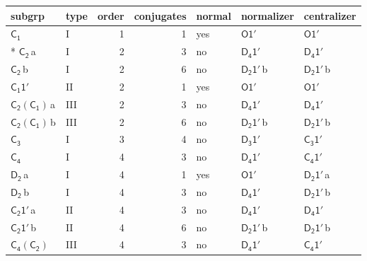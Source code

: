 \documentclass[10pt,a4paper]{article}
\numberwithin{equation}{section}
\newcommand{\grp}[1]{\mathsf{#1}}
\newcommand{\clsletter}[1]{\,{\scriptsize\color{black!55}#1}}
\begin{document}
{\small\begin{longtable}{@{}llrrlll@{}}\toprule
subgrp & type & order & conjugates & normal & normalizer & centralizer\\\midrule\endhead
\bottomrule\endfoot\endlastfoot
\href{../../../rotation/data/pdf/C1.pdf}{$\grp{C_{1}}$} & I & 1 & 1 & yes & \href{O-1p.pdf}{$\grp{O1'}$} & \href{O-1p.pdf}{$\grp{O1'}$}\\*
\href{../../../rotation/data/pdf/C2.pdf}{$\grp{C_{2}}$}\clsletter{a} & I & 2 & 3 & no & \href{D4-1p.pdf}{$\grp{D_{4}1'}$} & \href{D4-1p.pdf}{$\grp{D_{4}1'}$}\\
\href{../../../rotation/data/pdf/C2.pdf}{$\grp{C_{2}}$}\clsletter{b} & I & 2 & 6 & no & \href{D2-1p.pdf}{$\grp{D_{2}1'}$}\clsletter{b} & \href{D2-1p.pdf}{$\grp{D_{2}1'}$}\clsletter{b}\\
\href{C1-1p.pdf}{$\grp{C_{1}1'}$} & II & 2 & 1 & yes & \href{O-1p.pdf}{$\grp{O1'}$} & \href{O-1p.pdf}{$\grp{O1'}$}\\
\href{C2-C1.pdf}{$\grp{C_{2}}(\grp{C_{1}})$}\clsletter{a} & III & 2 & 3 & no & \href{D4-1p.pdf}{$\grp{D_{4}1'}$} & \href{D4-1p.pdf}{$\grp{D_{4}1'}$}\\
\href{C2-C1.pdf}{$\grp{C_{2}}(\grp{C_{1}})$}\clsletter{b} & III & 2 & 6 & no & \href{D2-1p.pdf}{$\grp{D_{2}1'}$}\clsletter{b} & \href{D2-1p.pdf}{$\grp{D_{2}1'}$}\clsletter{b}\\
\href{../../../rotation/data/pdf/C3.pdf}{$\grp{C_{3}}$} & I & 3 & 4 & no & \href{D3-1p.pdf}{$\grp{D_{3}1'}$} & \href{C3-1p.pdf}{$\grp{C_{3}1'}$}\\
\href{../../../rotation/data/pdf/C4.pdf}{$\grp{C_{4}}$} & I & 4 & 3 & no & \href{D4-1p.pdf}{$\grp{D_{4}1'}$} & \href{C4-1p.pdf}{$\grp{C_{4}1'}$}\\
\href{../../../rotation/data/pdf/D2.pdf}{$\grp{D_{2}}$}\clsletter{a} & I & 4 & 1 & yes & \href{O-1p.pdf}{$\grp{O1'}$} & \href{D2-1p.pdf}{$\grp{D_{2}1'}$}\clsletter{a}\\
\href{../../../rotation/data/pdf/D2.pdf}{$\grp{D_{2}}$}\clsletter{b} & I & 4 & 3 & no & \href{D4-1p.pdf}{$\grp{D_{4}1'}$} & \href{D2-1p.pdf}{$\grp{D_{2}1'}$}\clsletter{b}\\
\href{C2-1p.pdf}{$\grp{C_{2}1'}$}\clsletter{a} & II & 4 & 3 & no & \href{D4-1p.pdf}{$\grp{D_{4}1'}$} & \href{D4-1p.pdf}{$\grp{D_{4}1'}$}\\
\href{C2-1p.pdf}{$\grp{C_{2}1'}$}\clsletter{b} & II & 4 & 6 & no & \href{D2-1p.pdf}{$\grp{D_{2}1'}$}\clsletter{b} & \href{D2-1p.pdf}{$\grp{D_{2}1'}$}\clsletter{b}\\
\href{C4-C2.pdf}{$\grp{C_{4}}(\grp{C_{2}})$} & III & 4 & 3 & no & \href{D4-1p.pdf}{$\grp{D_{4}1'}$} & \href{C4-1p.pdf}{$\grp{C_{4}1'}$}\\

\end{longtable}}
\end{document}
